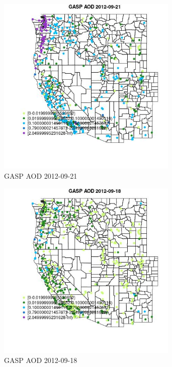 \begin{figure} 
\centering  
\includegraphics[width=0.77\textwidth]{Code_Outputs/Report_ML_input_PM25_Step4_part_e_de_duplicated_aves_compiled_2019-05-14wNAs_MapObsGASP_AOD2012-09-21.jpg} 
\caption{\label{fig:Report_ML_input_PM25_Step4_part_e_de_duplicated_aves_compiled_2019-05-14wNAsMapObsGASP_AOD2012-09-21}GASP AOD 2012-09-21} 
\end{figure} 
 

\begin{figure} 
\centering  
\includegraphics[width=0.77\textwidth]{Code_Outputs/Report_ML_input_PM25_Step4_part_e_de_duplicated_aves_compiled_2019-05-14wNAs_MapObsGASP_AOD2012-09-18.jpg} 
\caption{\label{fig:Report_ML_input_PM25_Step4_part_e_de_duplicated_aves_compiled_2019-05-14wNAsMapObsGASP_AOD2012-09-18}GASP AOD 2012-09-18} 
\end{figure} 
 

